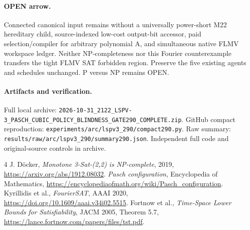 \documentclass[11pt]{article}
\begin{document}
\paragraph{OPEN arrow.}
Connected canonical input remains without a universally power-short M22 hereditary child, source-indexed low-cost output-bit accessor, paid selection/compiler for arbitrary polynomial A, and simultaneous native FLMV workspace ledger. Neither NP-completeness nor this Fourier counterexample transfers the tight FLMV SAT forbidden region. Preserve the five existing agents and schedules unchanged. P versus NP remains OPEN.
\paragraph{Artifacts and verification.}
Full local archive: \texttt{2026-10-31\_2122\_LSPV-3\_PASCH\_CUBIC\_POLICY\_BLINDNESS\_GATE290\_COMPLETE.zip}. GitHub compact reproduction: \texttt{experiments/arc/lspv3\_290/compact290.py}. Raw summary: \texttt{results/raw/arc/lspv3\_290/summary290.json}. Independent full code and original-source controls in archive.
\begin{thebibliography}{4}
 J. D\"ocker, \emph{Monotone 3-Sat-(2,2) is NP-complete}, 2019, \url{https://arxiv.org/abs/1912.08032}.
 \emph{Pasch configuration}, Encyclopedia of Mathematics, \url{https://encyclopediaofmath.org/wiki/Pasch_configuration}.
 Kyrillidis et al., \emph{FourierSAT}, AAAI 2020, \url{https://doi.org/10.1609/aaai.v34i02.5515}.
 Fortnow et al., \emph{Time-Space Lower Bounds for Satisfiability}, JACM 2005, Theorem 5.7, \url{https://lance.fortnow.com/papers/files/tst.pdf}.
\end{thebibliography}
\end{document}
